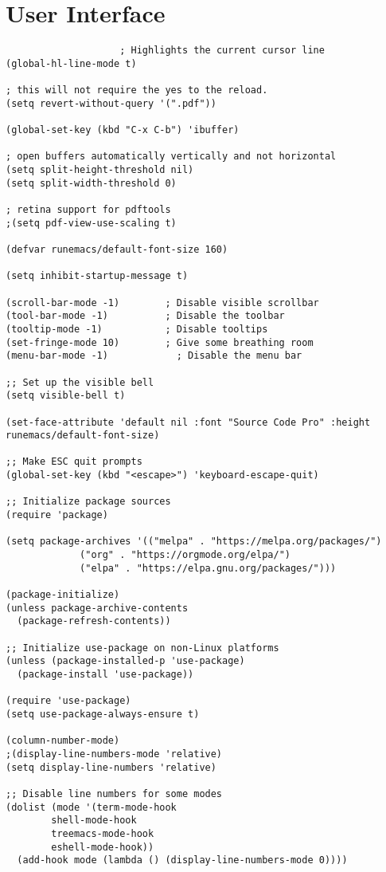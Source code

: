 \documentclass[11pt]{article}
\begin{document}
\section{User Interface}
\label{sec:org875d8ad}
\begin{verbatim}
					; Highlights the current cursor line
(global-hl-line-mode t)

; this will not require the yes to the reload.
(setq revert-without-query '(".pdf"))

(global-set-key (kbd "C-x C-b") 'ibuffer)

; open buffers automatically vertically and not horizontal
(setq split-height-threshold nil)
(setq split-width-threshold 0)

; retina support for pdftools
;(setq pdf-view-use-scaling t)

(defvar runemacs/default-font-size 160)

(setq inhibit-startup-message t)

(scroll-bar-mode -1)        ; Disable visible scrollbar
(tool-bar-mode -1)          ; Disable the toolbar
(tooltip-mode -1)           ; Disable tooltips
(set-fringe-mode 10)        ; Give some breathing room
(menu-bar-mode -1)            ; Disable the menu bar

;; Set up the visible bell
(setq visible-bell t)

(set-face-attribute 'default nil :font "Source Code Pro" :height runemacs/default-font-size)

;; Make ESC quit prompts
(global-set-key (kbd "<escape>") 'keyboard-escape-quit)

;; Initialize package sources
(require 'package)

(setq package-archives '(("melpa" . "https://melpa.org/packages/")
			 ("org" . "https://orgmode.org/elpa/")
			 ("elpa" . "https://elpa.gnu.org/packages/")))

(package-initialize)
(unless package-archive-contents
  (package-refresh-contents))

;; Initialize use-package on non-Linux platforms
(unless (package-installed-p 'use-package)
  (package-install 'use-package))

(require 'use-package)
(setq use-package-always-ensure t)

(column-number-mode)
;(display-line-numbers-mode 'relative)
(setq display-line-numbers 'relative)

;; Disable line numbers for some modes
(dolist (mode '(term-mode-hook
		shell-mode-hook
		treemacs-mode-hook
		eshell-mode-hook))
  (add-hook mode (lambda () (display-line-numbers-mode 0))))



\end{verbatim}
\end{document}
